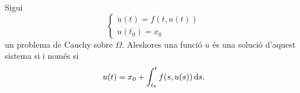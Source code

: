 \documentclass[../../Main.tex]{subfiles}
\begin{document}
	\begin{observation}
		\label{obs:solució general d'un problema de Cauchy}
		Sigui
		\[\begin{cases*}
			\displaystyle \dot{u}(t)=f(t,u(t)) \\
			\displaystyle u(t_{0})=x_{0}
		\end{cases*}\]
		un problema de Cauchy sobre \(\Omega\).
		Aleshores una funció \(u\) és una solució d'aquest sistema si i només si
		\[
		    u(t)=x_{0}+\int_{t_{0}}^{t}f(s,u(s))\mathop{}\!\mathrm{d} s.
		\]
	\end{observation}
\end{document}
